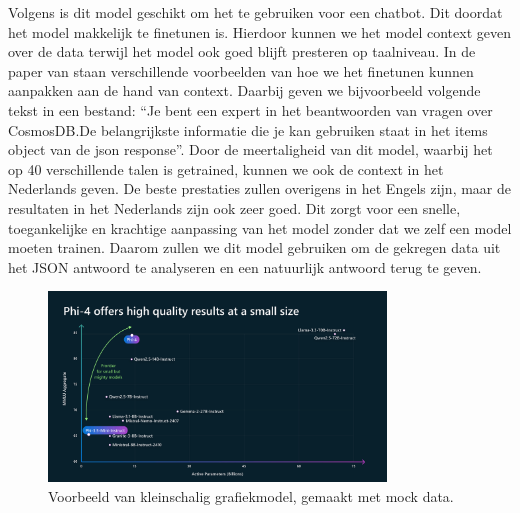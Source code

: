 Volgens \textcite{microsoft2024phi4} is dit model geschikt om het te gebruiken voor een chatbot. Dit doordat het model makkelijk te finetunen is.
Hierdoor kunnen we het model context geven over de data terwijl het model ook goed blijft presteren op taalniveau.
In de paper van \textcite{microsoft2024phi4} staan verschillende voorbeelden van hoe we het finetunen kunnen aanpakken aan de hand van context.
Daarbij geven we bijvoorbeeld volgende tekst in een bestand: ``Je bent een expert in het beantwoorden van vragen over CosmosDB.\@ De belangrijkste informatie die je kan gebruiken staat in het items object van de json response''.
Door de meertaligheid van dit model, waarbij het op 40 verschillende talen is getrained, kunnen we ook de context in het Nederlands geven.
De beste prestaties zullen overigens in het Engels zijn, maar de resultaten in het Nederlands zijn ook zeer goed.
Dit zorgt voor een snelle, toegankelijke en krachtige aanpassing van het model zonder dat we zelf een model moeten trainen.
Daarom zullen we dit model gebruiken om de gekregen data uit het JSON antwoord te analyseren en een natuurlijk antwoord terug te geven.

\begin{figure}[H]
     \centering
     \includegraphics[width=0.8\textwidth]{./img/MMLU.png}
     \caption[Voorbeeld Grafiekmodel.]{\label{fig:MMLU}Voorbeeld van kleinschalig grafiekmodel, gemaakt met mock data.}
\end{figure}

